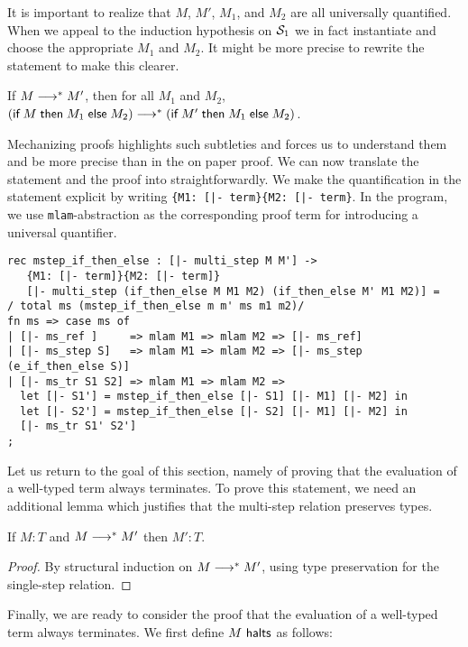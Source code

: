 It is important to realize that $M$, $M'$, $M_1$, and $M_2$ are all
universally quantified.  When we appeal to the induction hypothesis on
$\S_1$ we in fact instantiate and choose the appropriate $M_1$ and
$M_2$. It might be more precise to rewrite the statement to make this clearer.

\begin{center}
If $M \MSteps M'$, then for all $M_1$ and $M_2$, $(\tmif M {M_1} {M_2}) \MSteps (\tmif {M'} {M_1} {M_2})$.
\end{center}

Mechanizing proofs highlights such subtleties and forces us to
understand them and be more precise than in the on paper proof. We can
now translate the statement and the proof into
\beluga straightforwardly. We make the quantification in the
statement explicit by writing \lstinline!{M1: [|- term}{M2: [|- term}!. In the
program, we use \lstinline!mlam!-abstraction as the corresponding
proof term for introducing a universal quantifier.

\begin{lstlisting}
rec mstep_if_then_else : [|- multi_step M M'] ->
   {M1: [|- term]}{M2: [|- term]}
   [|- multi_step (if_then_else M M1 M2) (if_then_else M' M1 M2)] =
/ total ms (mstep_if_then_else m m' ms m1 m2)/
fn ms => case ms of
| [|- ms_ref ]     => mlam M1 => mlam M2 => [|- ms_ref]
| [|- ms_step S]   => mlam M1 => mlam M2 => [|- ms_step (e_if_then_else S)]
| [|- ms_tr S1 S2] => mlam M1 => mlam M2 =>
  let [|- S1'] = mstep_if_then_else [|- S1] [|- M1] [|- M2] in
  let [|- S2'] = mstep_if_then_else [|- S2] [|- M1] [|- M2] in
  [|- ms_tr S1' S2']
;
\end{lstlisting}


Let us return to the goal of this section, namely of proving that the
evaluation of a well-typed term always terminates. To prove this statement, we
need an additional lemma which justifies that the multi-step relation
preserves types.

\begin{lemma}
If $M : T$ and $M \MSteps M'$ then $M':T$.
\end{lemma}
\begin{proof}
By structural induction on $M \MSteps M'$, using type preservation for the single-step relation.
\end{proof}

Finally, we are ready to consider the proof that the evaluation of a well-typed term
always terminates. We first define $M \Halts$ as follows:

